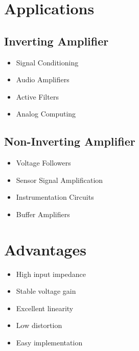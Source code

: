 \documentclass[12pt,a4paper]{report}
\begin{document}
\section{Applications}

\subsection*{Inverting Amplifier}

\begin{itemize}

\item Signal Conditioning

\item Audio Amplifiers

\item Active Filters

\item Analog Computing

\end{itemize}

\subsection*{Non-Inverting Amplifier}

\begin{itemize}

\item Voltage Followers

\item Sensor Signal Amplification

\item Instrumentation Circuits

\item Buffer Amplifiers

\end{itemize}

\section{Advantages}

\begin{itemize}

\item High input impedance

\item Stable voltage gain

\item Excellent linearity

\item Low distortion

\item Easy implementation

\end{itemize}
\end{document}
